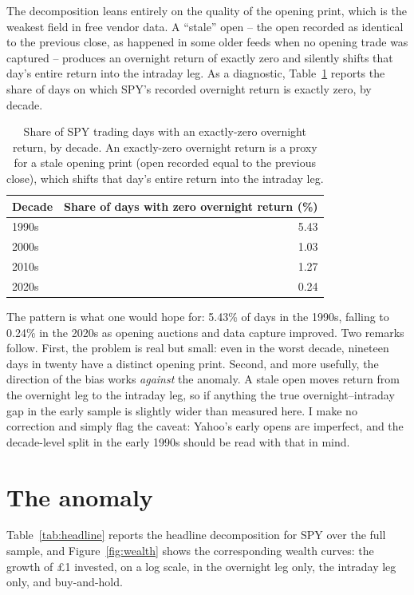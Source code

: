 \documentclass[11pt]{article}
\begin{document}
The decomposition leans entirely on the quality of the opening print, which is the weakest field in free vendor data. A ``stale'' open -- the open recorded as identical to the previous close, as happened in some older feeds when no opening trade was captured -- produces an overnight return of exactly zero and silently shifts that day's entire return into the intraday leg. As a diagnostic, Table~\ref{tab:quality} reports the share of days on which SPY's recorded overnight return is exactly zero, by decade.

\begin{table}[t]
\centering
\caption{Share of SPY trading days with an exactly-zero overnight return, by decade. An exactly-zero overnight return is a proxy for a stale opening print (open recorded equal to the previous close), which shifts that day's entire return into the intraday leg.}
\label{tab:quality}
\begin{tabular}{lr}
\toprule
Decade & Share of days with zero overnight return (\%) \\
\midrule
1990s & 5.43 \\
2000s & 1.03 \\
2010s & 1.27 \\
2020s & 0.24 \\
\bottomrule
\end{tabular}
\end{table}

The pattern is what one would hope for: 5.43\% of days in the 1990s, falling to 0.24\% in the 2020s as opening auctions and data capture improved. Two remarks follow. First, the problem is real but small: even in the worst decade, nineteen days in twenty have a distinct opening print. Second, and more usefully, the direction of the bias works \emph{against} the anomaly. A stale open moves return from the overnight leg to the intraday leg, so if anything the true overnight--intraday gap in the early sample is slightly wider than measured here. I make no correction and simply flag the caveat: Yahoo's early opens are imperfect, and the decade-level split in the early 1990s should be read with that in mind.

\section{The anomaly}
\label{sec:anomaly}

Table~\ref{tab:headline} reports the headline decomposition for SPY over the full sample, and Figure~\ref{fig:wealth} shows the corresponding wealth curves: the growth of \pounds 1 invested, on a log scale, in the overnight leg only, the intraday leg only, and buy-and-hold.
\end{document}
